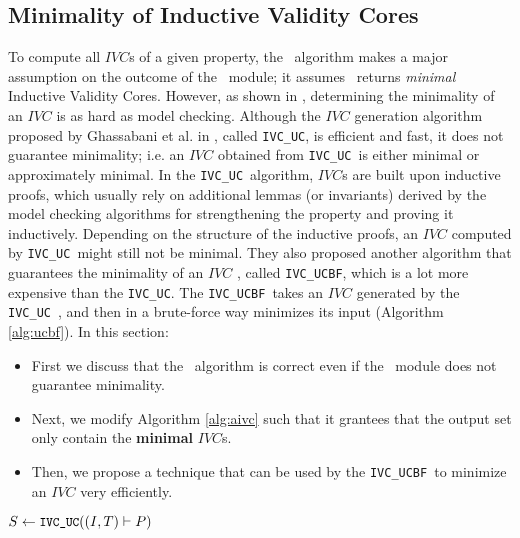 \subsection{Minimality of Inductive Validity Cores}
\label{subsec:minimality}
\newcommand{\ucalg}{\texttt{\small{IVC\_UC}}}
\newcommand{\ucbfalg}{\texttt{\small{IVC\_UCBF}}}

To compute all $IVC$s of a given property, the \aivcalg ~algorithm
 makes a major assumption on the outcome of the \getivc ~module;
it assumes \getivc ~returns \emph{minimal} Inductive Validity Cores. 
However, as shown in \cite{Ghass16}, 
determining  the minimality of  an  $IVC$ is  as  hard  as
model checking. Although the $IVC$ generation algorithm proposed by Ghassabani et al. 
 in \cite{Ghass16}, called \ucalg ,
is efficient and fast, it does not guarantee minimality;
i.e. an $IVC$ obtained from \ucalg ~is either minimal or approximately minimal. 
In the \ucalg ~algorithm, $IVC$s are built upon inductive proofs, 
which usually rely on additional
lemmas (or invariants) derived by the model checking algorithms 
for strengthening the property and proving it
inductively. 
Depending on the structure of the inductive
proofs, an $IVC$ computed by \ucalg ~might still not be minimal. 
They also proposed another algorithm that guarantees 
the minimality of an $IVC$ \cite{Ghass16}, called \ucbfalg, which is a lot more expensive than the \ucalg. The \ucbfalg ~takes an $IVC$ generated by 
the \ucalg ~, and then in a brute-force way minimizes its input (Algorithm \ref{alg:ucbf}). In this section:
\begin{itemize}
\item First we discuss that the \aivcalg ~algorithm is correct even if
 the \getivc ~module does not guarantee minimality.
\item Next, we modify Algorithm \ref{alg:aivc}
 such that it grantees that the output set only contain the \textbf{minimal} $IVC$s. 
\item Then, we propose a technique that can be used by the \ucbfalg ~to
 minimize an $IVC$ very efficiently. 
\end{itemize} 


\begin{algorithm}
  \BlankLine
  $S \leftarrow \ucalg((I, T) \vdash P)$ \\
   {
  }
\caption{An abstract representation of \ucbfalg \cite{Ghass16}}
\label{alg:ucbf}
\end{algorithm}

